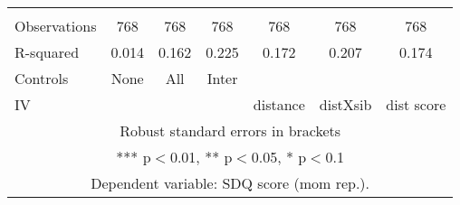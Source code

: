 \begin{tabular}{lcccccc}
 &  &  &  &  &  &  \\
Observations & 768 & 768 & 768 & 768 & 768 & 768 \\
R-squared & 0.014 & 0.162 & 0.225 & 0.172 & 0.207 & 0.174 \\
Controls & None & All & Inter &  &  &  \\
 IV &  &  &  & distance & distXsib & dist score \\ \hline
\multicolumn{7}{c}{ Robust standard errors in brackets} \\
\multicolumn{7}{c}{ *** p$<$0.01, ** p$<$0.05, * p$<$0.1} \\
\multicolumn{7}{c}{ Dependent variable: SDQ score (mom rep.).} \\
\end{tabular}
